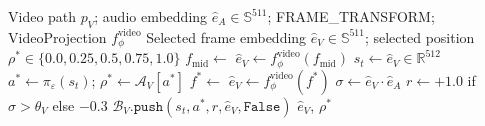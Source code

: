 \documentclass[12pt,a4paper]{article}
\theoremstyle{definition}
\theoremstyle{plain}
\theoremstyle{remark}
\newcommand{\R}{\mathbb{R}}
\newcommand{\Sph}{\mathbb{S}}
\begin{document}
\begin{algorithm}[H]
\caption{RL-Video Policy --- Frame Selection and Feedback}
\label{alg:rl_video}
\begin{algorithmic}[1]
\Require Video path $p_V$; audio embedding $\hat{e}_A\in\Sph^{511}$;
         FRAME\_TRANSFORM; VideoProjection $f_\phi^{\text{video}}$
\Ensure Selected frame embedding $\hat{e}_V\in\Sph^{511}$;
        selected position $\rho^*\in\{0.0,0.25,0.5,0.75,1.0\}$
\State $f_{\text{mid}} \gets$ 
\State $\hat{e}_V \gets f_\phi^{\text{video}}(f_{\text{mid}})$
\State $s_t \gets \hat{e}_V \in \R^{512}$
\State $a^* \gets \pi_\varepsilon(s_t)$; \quad $\rho^* \gets \mathcal{A}_V[a^*]$
\State $f^* \gets$ 
\State $\hat{e}_V \gets f_\phi^{\text{video}}(f^*)$
\State $\sigma \gets \hat{e}_V \cdot \hat{e}_A$
\State $r \gets +1.0$ if $\sigma > \theta_V$ else $-0.3$
\State $\mathcal{B}_V.\texttt{push}(s_t,a^*,r,\hat{e}_V,\texttt{False})$
\State {}
\State \Return $\hat{e}_V$, $\rho^*$
\end{algorithmic}
\end{algorithm}
\end{document}
